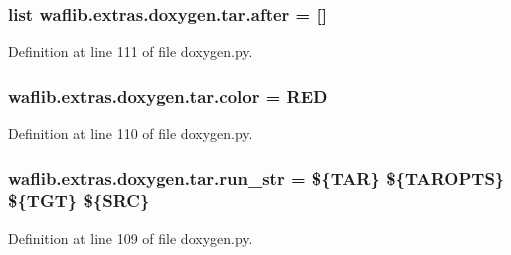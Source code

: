 \subsubsection[{\texorpdfstring{after}{after}}]{\setlength{\rightskip}{0pt plus 5cm}list waflib.\+extras.\+doxygen.\+tar.\+after = \mbox{[}\textquotesingle{}\mbox{]}\hspace{0.3cm}{\ttfamily [static]}}\hypertarget{classwaflib_1_1extras_1_1doxygen_1_1tar_a665652f06b77bd20d26d64bd7e9e7fa6}{}\label{classwaflib_1_1extras_1_1doxygen_1_1tar_a665652f06b77bd20d26d64bd7e9e7fa6}


Definition at line 111 of file doxygen.\+py.

\subsubsection[{\texorpdfstring{color}{color}}]{ waflib.\+extras.\+doxygen.\+tar.\+color = \textquotesingle{}R\+ED\textquotesingle{}\hspace{0.3cm}{\ttfamily [static]}}\hypertarget{classwaflib_1_1extras_1_1doxygen_1_1tar_ade6dc7ab8aa5fe7246224356051e3b05}{}\label{classwaflib_1_1extras_1_1doxygen_1_1tar_ade6dc7ab8aa5fe7246224356051e3b05}


Definition at line 110 of file doxygen.\+py.

\subsubsection[{\texorpdfstring{run\+\_\+str}{run_str}}]{ waflib.\+extras.\+doxygen.\+tar.\+run\+\_\+str = \textquotesingle{}\$\{T\+AR\} \$\{T\+A\+R\+O\+P\+TS\} \$\{T\+GT\} \$\{S\+RC\}\textquotesingle{}\hspace{0.3cm}{\ttfamily [static]}}\hypertarget{classwaflib_1_1extras_1_1doxygen_1_1tar_ada1adbaf9b445b680c0f8b94eca77f23}{}\label{classwaflib_1_1extras_1_1doxygen_1_1tar_ada1adbaf9b445b680c0f8b94eca77f23}


Definition at line 109 of file doxygen.\+py.

